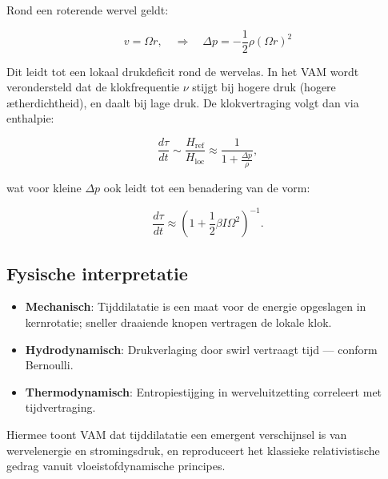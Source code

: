 Rond een roterende wervel geldt:

\[
v = \Omega r, \quad \Rightarrow \quad \Delta p = -\frac{1}{2} \rho (\Omega r)^2
\]

Dit leidt tot een lokaal drukdeficit rond de wervelas. In het VAM wordt verondersteld dat de klokfrequentie $\nu$ stijgt bij hogere druk (hogere ætherdichtheid), en daalt bij lage druk. De klokvertraging volgt dan via enthalpie:

\begin{equation}
\frac{d\tau}{dt} \sim \frac{H_\text{ref}}{H_\text{loc}} \approx \frac{1}{1 + \frac{\Delta p}{\rho}},
\end{equation}

wat voor kleine $\Delta p$ ook leidt tot een benadering van de vorm:

\begin{equation}
\frac{d\tau}{dt} \approx \left(1 + \frac{1}{2} \beta I \Omega^2 \right)^{-1}.
\end{equation}

\subsection{Fysische interpretatie}

\begin{itemize}
    \item \textbf{Mechanisch}: Tijddilatatie is een maat voor de energie opgeslagen in kernrotatie; sneller draaiende knopen vertragen de lokale klok.
    \item \textbf{Hydrodynamisch}: Drukverlaging door swirl vertraagt tijd — conform Bernoulli.
    \item \textbf{Thermodynamisch}: Entropiestijging in werveluitzetting correleert met tijdvertraging.
\end{itemize}

Hiermee toont VAM dat tijddilatatie een emergent verschijnsel is van wervelenergie en stromingsdruk, en reproduceert het klassieke relativistische gedrag vanuit vloeistofdynamische principes.